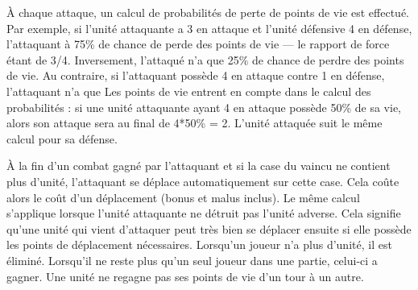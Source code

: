 	À chaque attaque, un calcul de probabilités de perte de points de vie est effectué. Par exemple, si l’unité attaquante a 3 en attaque et l’unité défensive 4 en défense, l’attaquant à 75\% de chance de perde des points de vie --- le rapport de force étant de 3/4. Inversement, l'attaqué n'a que 25\% de chance de perdre des points de vie. Au contraire, si l'attaquant possède 4 en attaque contre 1 en défense, l'attaquant n'a que Les points de vie entrent en compte dans le calcul des probabilités : si une unité attaquante ayant	4 en attaque possède 50\% de sa vie, alors son attaque sera au final de 4*50\% = 2. L’unité attaquée suit le même calcul pour sa défense.

	À la fin d’un combat gagné par l’attaquant et si la case du vaincu ne contient plus d’unité, l’attaquant se déplace automatiquement sur cette case. Cela coûte alors le coût d’un déplacement (bonus et malus inclus). Le même calcul s’applique lorsque l’unité attaquante ne détruit pas l’unité adverse.	Cela signifie qu’une unité qui vient d’attaquer peut très bien se déplacer ensuite si elle possède les points de déplacement nécessaires. Lorsqu’un joueur n’a plus d’unité, il est éliminé. Lorsqu’il ne reste plus qu’un seul joueur dans une partie, celui-ci a gagner. Une unité ne regagne pas ses points de vie d’un tour à un autre.
	
	
	

	
	
